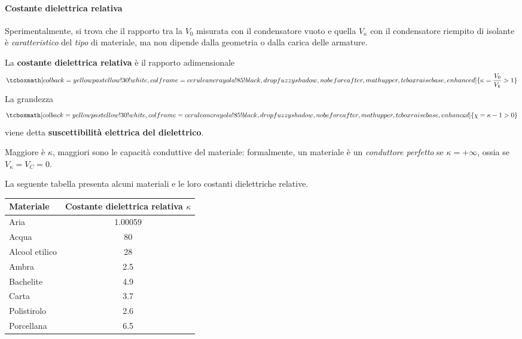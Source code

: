 \paragraph{Costante dielettrica relativa}
Sperimentalmente, si trova che il rapporto tra la \ddp $V_0$ misurata con il condensatore vuoto e quella $V_{\kappa}$ con il condensatore riempito di isolante è \textit{caratteristico} del \textit{tipo} di materiale, ma non dipende dalla geometria o dalla carica delle armature.
\begin{define}
	La \textbf{costante dielettrica relativa} è il rapporto adimensionale
	\begin{equation}
		\tcboxmath[colback=yellowpastellow!30!white,colframe=ceruleancrayola!85!black,drop fuzzy shadow, nobeforeafter, math upper, tcbox raise base, enhanced]{\kappa=\frac{V_0}{V_k}>1}
	\end{equation}
	La grandezza
	\begin{equation}
		\tcboxmath[colback=yellowpastellow!30!white,colframe=ceruleancrayola!85!black,drop fuzzy shadow, nobeforeafter, math upper, tcbox raise base, enhanced]{\chi=\kappa - 1>0}
	\end{equation}
	viene detta \textbf{suscettibilità elettrica del dielettrico}.
\end{define}
Maggiore è $\kappa$, maggiori sono le capacità conduttive del materiale: formalmente, un materiale è un \textit{conduttore perfetto} se $\kappa=+\infty$, ossia se $V_{\kappa}=V_C=0$.

La seguente tabella presenta alcuni materiali e le loro costanti dielettriche relative.
\begin{center}
	\begin{tabular}{lc}
		\textbf{Materiale}      & \textbf{Costante dielettrica relativa} $\kappa$\\\hline
		Aria           & \num{1,00059}                                                                    \\
		Acqua          & \num{80}                                                                         \\
		Alcool etilico & \num{28}                                                                         \\
		Ambra          & \num{2,5}                                                                        \\
		Bachelite      & \num{4,9}                                                                        \\
		Carta          & \num{3,7}                                                                        \\
		Polistirolo    & \num{2,6}                                                                        \\
		Porcellana     & \num{6,5}                                                                       
	\end{tabular}
\end{center}

